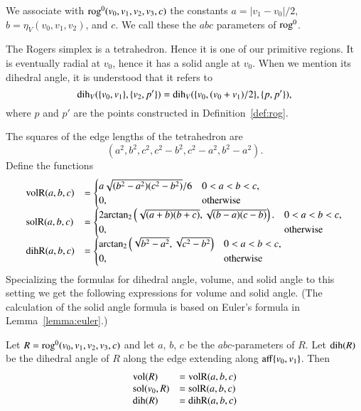 \begin{definition}
We associate with ${\operatorname{rog}}^0(v_0,v_1,v_2,v_3,c)$ the constants
$a=|v_1-v_0|/2$, $b=\eta_V(v_0,v_1,v_2)$, and $c$.
We call these the $abc$ parameters of ${\operatorname{rog}}^0$. 
\end{definition}

The Rogers simplex is a tetrahedron.  Hence it is one of our
primitive regions.  It is eventually radial at $v_0$, hence
it has a solid angle at $v_0$.  When we mention its dihedral
angle, it is understood that it refers to 
   $$
   \operatorname{dih}_V(\{v_0,v_1\},\{v_2,p'\})=\operatorname{dih}_V(\{v_0,(v_0+v_1)/2\},\{p,p'\}),
   $$
where $p$ and $p'$ are the points 
constructed in Definition~\ref{def:rog}.

The squares of the edge lengths of the tetrahedron are
   $$
   (a^2,b^2,c^2,c^2-b^2,c^2-a^2,b^2-a^2).
   $$
Define the functions
   $$
   \begin{array}{lll}
     {\operatorname{volR}}(a,b,c) &= \begin{cases}
       a\sqrt{(b^2-a^2)(c^2-b^2)}/6& 0 < a < b < c,\\
       0,&\text{otherwise}
       \end{cases}\\
     {\operatorname{solR}}(a,b,c) &= \begin{cases}
      2 {\operatorname{arctan_2}}\left(\sqrt{{(a+b)(b+c)}},
         \sqrt{{(b-a) (c-b)}}\right).& 0 < a < b < c,\\
      0,&\text{otherwise}
     \end{cases}\\
     {\operatorname{dihR}}(a,b,c) &= \begin{cases}
      {\operatorname{arctan\ensuremath{_2}}}\left(\sqrt{b^2 - a^2},\sqrt{c^2 - b^2}\right)
      & 0 < a < b < c,\\
      0,&\text{otherwise}
     \end{cases}
     \end{array}
   $$
Specializing the formulas for dihedral angle, volume, and solid angle to this
setting we get the following expressions for volume and solid angle.
(The calculation of the
 solid angle formula is based on Euler's formula in 
Lemma~\ref{lemma:euler}.)

\begin{lemma}\label{lemma:rog:abc} 
Let $R={\operatorname{rog}}^0(v_0,v_1,v_2,v_3,c)$ and let $a$, $b$,
$c$ be the $abc$-parameters of $R$.  Let ${\operatorname{dih}}(R)$ be the dihedral
angle of $R$ along the edge extending along ${\operatorname{aff}}\{v_0,v_1\}$.  Then
$$
\begin{array}{lll}
{\operatorname{vol}}(R) &= {\operatorname{volR}}(a,b,c)\\
{\operatorname{sol}}(v_0,R) &= {\operatorname{solR}}(a,b,c)\\
{\operatorname{dih}}(R) &= {\operatorname{dihR}}(a,b,c)\\
\end{array}
$$
\end{lemma}






